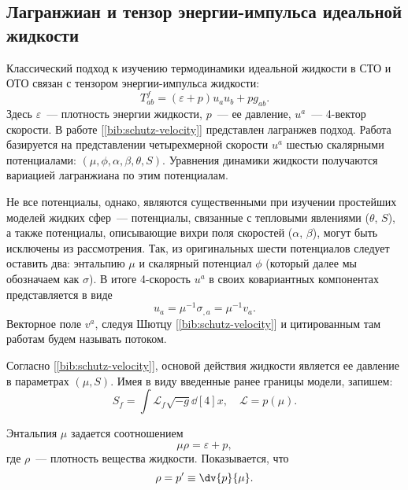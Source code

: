 \documentclass[\docroot/reports/draft/report.tex]{subfiles}
\begin{document}
\onlyinsubfile{\tableofcontents}

\subsection{Лагранжиан и тензор энергии-импульса идеальной жидкости}

    Классический подход к изучению термодинамики идеальной жидкости в СТО и ОТО связан с тензором энергии-импульса жидкости:
    \begin{equation*}
        T^f_{ab} = (\varepsilon + p) u_a u_b + p g_{ab} .
    \end{equation*}
    Здесь $\varepsilon$~--- плотность энергии жидкости, $p$~--- ее давление, $u^a$~--- 4-вектор скорости. В работе [\ref{bib:schutz-velocity}] представлен лагранжев подход. Работа базируется на представлении четырехмерной скорости $u^a$ шестью скалярными потенциалами: $(\mu,\phi,\alpha,\beta,\theta,S)$. Уравнения динамики жидкости получаются вариацией лагранжиана по этим потенциалам.

    Не все потенциалы, однако, являются существенными при изучении простейших моделей жидких сфер~--- потенциалы, связанные с тепловыми явлениями ($\theta$, $S$), а также потенциалы, описывающие вихри поля скоростей ($\alpha$, $\beta$), могут быть исключены из рассмотрения. Так, из оригинальных шести потенциалов следует оставить два: энтальпию $\mu$ и скалярный потенциал $\phi$ (который далее мы обозначаем как $\sigma$). В итоге 4-скорость $u^a$ в своих ковариантных компонентах представляется в виде
    \begin{equation*}
        u_a = \mu^{-1} \sigma_{,a} = \mu^{-1} v_a .
    \end{equation*}
    Векторное поле $v^a$, следуя Шютцу [\ref{bib:schutz-velocity}] и цитированным там работам будем называть потоком.

    Согласно [\ref{bib:schutz-velocity}], основой действия жидкости является ее давление в параметрах $(\mu,S)$. Имея в виду введенные ранее границы модели, запишем:
    \begin{equation}
        S_f = \int \mathcal{L}_f \sqrt{-g} \dd[4]{x} , \quad
        \mathcal{L} = p(\mu) .
    \end{equation}

    Энтальпия $\mu$ задается соотношением
    \begin{equation*}
        \mu\rho = \varepsilon + p ,
    \end{equation*}
    где $\rho$~--- плотность вещества жидкости. Показывается, что
    \begin{equation*}
        \rho = p' \equiv \dv{p}{\mu} .
    \end{equation*}
\end{document}

